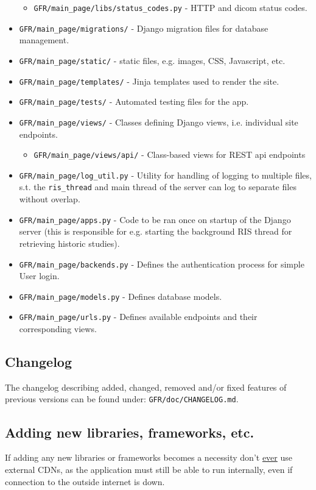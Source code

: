 \documentclass{article}
\begin{document}
\begin{itemize}
\begin{itemize}
		\item \texttt{GFR/main\_page/libs/status\_codes.py} - HTTP and dicom status codes.
	\end{itemize}
	\item \texttt{GFR/main\_page/migrations/} - Django migration files for database management.
	\item \texttt{GFR/main\_page/static/} - static files, e.g. images, CSS, Javascript, etc.
	\item \texttt{GFR/main\_page/templates/} - Jinja templates used to render the site.
	\item \texttt{GFR/main\_page/tests/} - Automated testing files for the app.
	\item \texttt{GFR/main\_page/views/} - Classes defining Django views, i.e. individual site endpoints.
	\begin{itemize}
		\item \texttt{GFR/main\_page/views/api/} - Class-based views for REST api endpoints
	\end{itemize}
	\item \texttt{GFR/main\_page/log\_util.py} - Utility for handling of logging to multiple files, s.t. the \texttt{ris\_thread} and main thread of the server can log to separate files without overlap.
	\item \texttt{GFR/main\_page/apps.py} - Code to be ran once on startup of the Django server (this is responsible for e.g. starting the background RIS thread for retrieving historic studies).
	\item \texttt{GFR/main\_page/backends.py} - Defines the authentication process for simple User login.
	\item \texttt{GFR/main\_page/models.py} - Defines database models.
	\item \texttt{GFR/main\_page/urls.py} - Defines available endpoints and their corresponding views.
\end{itemize}

\subsection{Changelog}
The changelog describing added, changed, removed and/or fixed features of previous versions can be found under: \texttt{GFR/doc/CHANGELOG.md}.

\subsection{Adding new libraries, frameworks, etc.}
If adding any new libraries or frameworks becomes a necessity don't \underline{ever} use external CDNs, as the application must still be able to run internally, even if connection to the outside internet is down.
\end{document}
